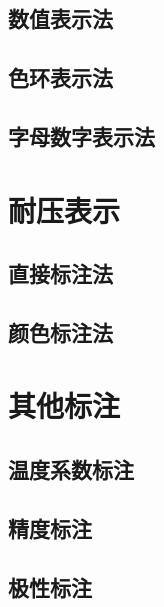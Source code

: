 \documentclass[12pt,UTF8]{ctexbook}
\begin{document}
\subsection{数值表示法}

\subsection{色环表示法}

\subsection{字母数字表示法}

\section{耐压表示}

\subsection{直接标注法}

\subsection{颜色标注法}

\section{其他标注}

\subsection{温度系数标注}

\subsection{精度标注}

\subsection{极性标注}
\end{document}
